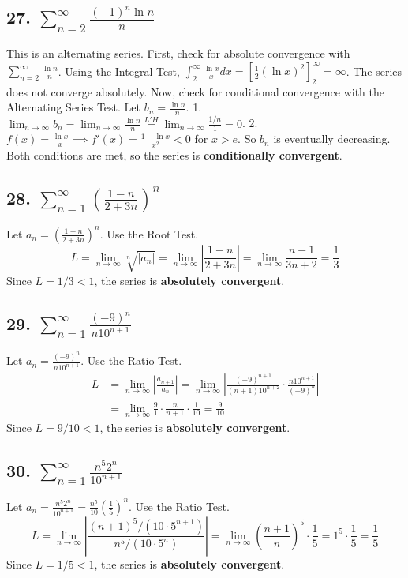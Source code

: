 \documentclass{article}
\begin{document}
\subsection*{27. $\sum_{n=2}^{\infty} \frac{(-1)^n \ln n}{n}$}
This is an alternating series. First, check for absolute convergence with $\sum_{n=2}^{\infty} \frac{\ln n}{n}$. Using the Integral Test, $\int_2^\infty \frac{\ln x}{x} dx = [\frac{1}{2}(\ln x)^2]_2^\infty = \infty$. The series does not converge absolutely.
Now, check for conditional convergence with the Alternating Series Test. Let $b_n = \frac{\ln n}{n}$.
1. $\lim_{n \to \infty} b_n = \lim_{n \to \infty} \frac{\ln n}{n} \overset{L'H}{=} \lim_{n \to \infty} \frac{1/n}{1} = 0$.
2. $f(x) = \frac{\ln x}{x} \implies f'(x) = \frac{1-\ln x}{x^2} < 0$ for $x > e$. So $b_n$ is eventually decreasing.
Both conditions are met, so the series is \textbf{conditionally convergent}.

\subsection*{28. $\sum_{n=1}^{\infty} \left(\frac{1-n}{2+3n}\right)^n$}
Let $a_n = \left(\frac{1-n}{2+3n}\right)^n$. Use the Root Test.
\[ L = \lim_{n \to \infty} \sqrt[n]{|a_n|} = \lim_{n \to \infty} \left| \frac{1-n}{2+3n} \right| = \lim_{n \to \infty} \frac{n-1}{3n+2} = \frac{1}{3} \]
Since $L = 1/3 < 1$, the series is \textbf{absolutely convergent}.

\subsection*{29. $\sum_{n=1}^{\infty} \frac{(-9)^n}{n 10^{n+1}}$}
Let $a_n = \frac{(-9)^n}{n 10^{n+1}}$. Use the Ratio Test.
\begin{align*}
L &= \lim_{n \to \infty} \left| \frac{a_{n+1}}{a_n} \right| = \lim_{n \to \infty} \left| \frac{(-9)^{n+1}}{(n+1)10^{n+2}} \cdot \frac{n 10^{n+1}}{(-9)^n} \right| \\
&= \lim_{n \to \infty} \frac{9}{1} \cdot \frac{n}{n+1} \cdot \frac{1}{10} = \frac{9}{10}
\end{align*}
Since $L = 9/10 < 1$, the series is \textbf{absolutely convergent}.

\subsection*{30. $\sum_{n=1}^{\infty} \frac{n^5 2^n}{10^{n+1}}$}
Let $a_n = \frac{n^5 2^n}{10^{n+1}} = \frac{n^5}{10} \left(\frac{1}{5}\right)^n$. Use the Ratio Test.
\[ L = \lim_{n \to \infty} \left| \frac{(n+1)^5/ (10 \cdot 5^{n+1})}{n^5 / (10 \cdot 5^n)} \right| = \lim_{n \to \infty} \left(\frac{n+1}{n}\right)^5 \cdot \frac{1}{5} = 1^5 \cdot \frac{1}{5} = \frac{1}{5} \]
Since $L = 1/5 < 1$, the series is \textbf{absolutely convergent}.
\end{document}
